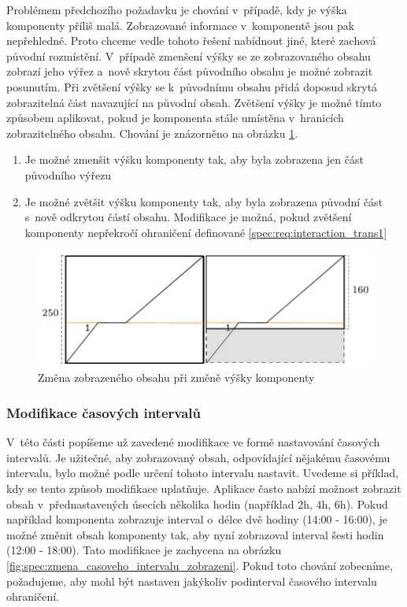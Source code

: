 Problémem předchozího požadavku je chování v~případě, kdy je výška komponenty příliš malá. Zobrazované informace v~komponentě jsou pak nepřehledné. Proto chceme vedle tohoto řešení nabídnout jiné, které zachová původní rozmístění. V~případě zmenšení výšky se ze zobrazovaného obsahu zobrazí jeho výřez a~nově skrytou část původního obsahu je možné zobrazit posunutím. Při zvětšení výšky se k~původnímu obsahu přidá doposud skrytá zobrazitelná část navazující na původní obsah. Zvětšení výšky je možné tímto způsobem aplikovat, pokud je komponenta stále umístěna v~hranicích zobrazitelného obsahu. Chování je znázorněno na obrázku \ref{fig:spec:zmena_velikosti_vertikalni_modifikace_2}.

\begin{enumerate}[label=\color{reqcolor}\textbf{R{\arabic*}},resume]
	\item \label{spec:req:height_mod2} Je možné zmenšit výšku komponenty tak, aby byla zobrazena jen část původního výřezu
	\item \label{spec:req:height_mod3} Je možné zvětšit výšku komponenty tak, aby byla zobrazena původní část s~nově odkrytou částí obsahu. Modifikace je možná, pokud zvětšení komponenty nepřekročí ohraničení definované \ref{spec:req:interaction_trans1}
\end{enumerate}

\begin{figure}[!htb]
	\centering					
	\includegraphics[width=\textwidth]{../img/kap2_vertical_resize_view_change}
	\caption{Změna zobrazeného obsahu při změně výšky komponenty}
	\label{fig:spec:zmena_velikosti_vertikalni_modifikace_2}
\end{figure}

\subsubsection*{Modifikace časových intervalů}
\label{kap2:modifikace_cas_intervaly}
V~této části popíšeme už zavedené modifikace ve formě nastavování časových intervalů. Je užitečné, aby zobrazovaný obsah, odpovídající nějakému časovému intervalu, bylo možné podle určení tohoto intervalu nastavit. Uvedeme si příklad, kdy se tento způsob modifikace uplatňuje. Aplikace často nabízí možnost zobrazit obsah v~přednastavených úsecích několika hodin (například 2h, 4h, 6h). Pokud například komponenta zobrazuje interval o~délce dvě hodiny (14:00 - 16:00), je možné změnit obsah komponenty tak, aby nyní zobrazoval interval šesti hodin (12:00 - 18:00). Tato modifikace je zachycena na obrázku \ref{fig:spec:zmena_casoveho_intervalu_zobrazeni}. Pokud toto chování zobecníme, požadujeme, aby mohl být nastaven jakýkoliv podinterval časového intervalu ohraničení.

